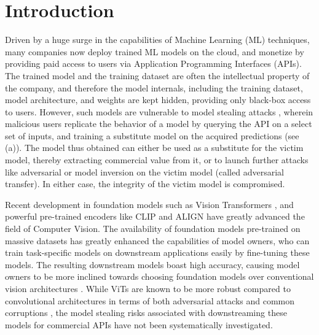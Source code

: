 
\section{Introduction}
\label{sec:intro}

%
Driven by a huge surge in the capabilities of Machine Learning (ML) techniques, many companies now deploy trained ML models on the cloud, and monetize by providing paid access to users via Application Programming Interfaces (APIs). The trained model and the training dataset are often the intellectual property of the company, and therefore the model internals, including the training dataset, model architecture, and weights are kept hidden, providing only black-box access to users. However, such models are vulnerable to model stealing attacks \cite{papernot2017practical,tramer2016stealing,orekondy2019knockoff}, wherein malicious users replicate the behavior of a model by querying the API on a select set of inputs, and training a substitute model on the acquired predictions (see (a)). 
The model thus obtained can either be used as a substitute for the victim model, thereby extracting commercial value from it, or to launch further attacks like adversarial \cite{goodfellow2014explaining,mazeika2022steer} or model inversion \cite{zhang2020secret} on the victim model (called adversarial transfer). In either case, the integrity of the victim model is compromised.
 

%
Recent development in foundation models such as Vision Transformers \cite{dosovitskiy2020image}, and powerful pre-trained encoders like CLIP \cite{radford2021learning} and ALIGN \cite{jia2021scaling} have greatly advanced the field of Computer Vision. 
The availability of foundation models pre-trained on massive datasets has greatly enhanced the capabilities of model owners, who can train task-specific models on downstream applications easily by fine-tuning these models. The resulting downstream models boast high accuracy, causing model owners to be more inclined towards choosing foundation models over conventional vision architectures \cite{he2016deep,inception}. 
While ViTs \cite{dosovitskiy2020image} are known to be more robust compared to convolutional architectures in terms of both adversarial attacks \cite{shao2022adversarial} and common corruptions \cite{paul2022vision}, the model stealing risks associated with downstreaming these models for commercial APIs have not been systematically investigated.

